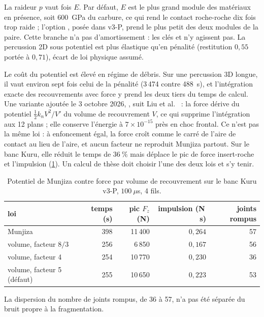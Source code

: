 La raideur $p$ vaut  fois $E$. Par défaut, $E$ est le plus grand module des matériaux en présence, soit 600~GPa du carbure, ce qui rend le contact roche-roche dix fois trop raide ; l'option , posée dans v3-P, prend le plus petit des deux modules de la paire. Cette branche n'a pas d'amortissement : les clés  et  n'y agissent pas. La percussion 2D sous potentiel est plus élastique qu'en pénalité (restitution $0{,}55$ portée à $0{,}71$), écart de loi physique assumé.

Le coût du potentiel est élevé en régime de débris. Sur une percussion 3D longue, il vaut environ sept fois celui de la pénalité (3\,474 contre 488~s), et l'intégration exacte des recouvrements avec force y prend les deux tiers du temps de calcul. Une variante ajoutée le 3 octobre 2026, , suit Liu et al.~\cite{liu2022overlap} : la force dérive du potentiel $\frac12 k_n V^2/V'$ du volume de recouvrement $V$, ce qui supprime l'intégration aux 12 plans ; elle conserve l'énergie à $7\times10^{-15}$ près en choc frontal. Ce n'est pas la même loi : à enfoncement égal, la force croît comme le carré de l'aire de contact au lieu de l'aire, et aucun facteur ne reproduit Munjiza partout. Sur le banc Kuru, elle réduit le temps de $36~\%$ mais déplace le pic de force insert-roche et l'impulsion (\cref{tab-potvolume}). Un calcul de thèse doit choisir l'une des deux lois et s'y tenir.

\begin{table}[htbp]
\centering
\caption{Potentiel de Munjiza contre force par volume de recouvrement sur le banc Kuru v3-P, $100~\mu$s, 4 fils.}
\label{tab-potvolume}
\begin{tabular}{@{}lrrrr@{}}
\toprule
loi & temps (s) & pic $F_z$ (N) & impulsion (N\,s) & joints rompus \\
\midrule
Munjiza & 398 & 11\,400 & $0{,}264$ & 57 \\
volume, facteur $8/3$ & 256 & 6\,850 & $0{,}167$ & 56 \\
volume, facteur 4 & 254 & 10\,770 & $0{,}230$ & 36 \\
volume, facteur 5 (défaut) & 255 & 10\,650 & $0{,}223$ & 53 \\
\bottomrule
\end{tabular}
\end{table}

La dispersion du nombre de joints rompus, de 36 à 57, n'a pas été séparée du bruit propre à la fragmentation.

